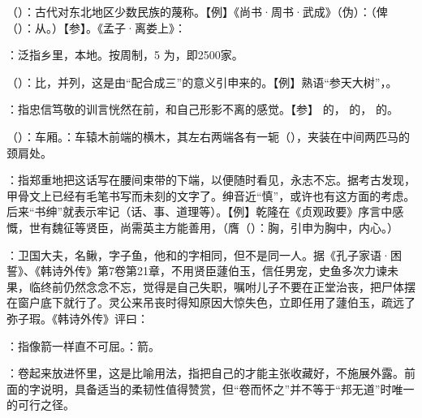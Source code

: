 {
\item {}（）：古代对东北地区少数民族的蔑称。【例】《尚书·周书·武成》（伪）：（俾（）：从。）【参】。《孟子·离娄上》：

\item {}：泛指乡里，本地。按周制，5 为，即2500家。%
\item {}（）：比，并列，这是由“配合成三”的意义引申来的。【例】熟语“参天大树”，。

：指忠信笃敬的训言恍然在前，和自己形影不离的感觉。【参】 的， 的， 的。
\item {}（）：车厢。：车辕木前端的横木，其左右两端各有一轭（），夹装在中间两匹马的颈肩处。
\item {}：指郑重地把这话写在腰间束带的下端，以便随时看见，永志不忘。据考古发现，甲骨文上已经有毛笔书写而未刻的文字了。绅音近“慎”，或许也有这方面的考虑。后来“书绅”就表示牢记（话、事、道理等）。【例】乾隆在《贞观政要》序言中感慨，世有魏征等贤臣，尚需英主方能善用，（膺（）：胸，引申为胸中，内心。） %
}
{} %


{
\item {}：卫国大夫，名鳅，字子鱼，他和的字相同，但不是同一人。据《孔子家语·困誓》、《韩诗外传》第7卷第21章，不用贤臣蘧伯玉，信任男宠，史鱼多次力谏未果，临终前仍然念念不忘，觉得是自己失职，嘱咐儿子不要在正堂治丧，把尸体摆在窗户底下就行了。灵公来吊丧时得知原因大惊失色，立即任用了蘧伯玉，疏远了弥子瑕。《韩诗外传》评曰：
\item {}：指像箭一样直不可屈。：箭。
\item {}：卷起来放进怀里，这是比喻用法，指把自己的才能主张收藏好，不施展外露。前面的字说明，具备适当的柔韧性值得赞赏，但“卷而怀之”并不等于“邦无道”时唯一的可行之径。
}
{}


